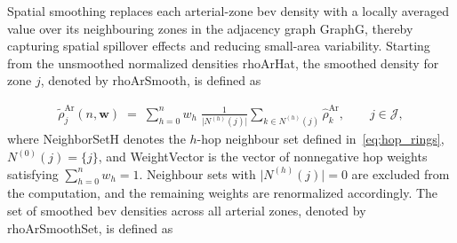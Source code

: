 Spatial smoothing replaces each arterial-zone \gls{bev} density with a locally averaged value over its neighbouring zones in the adjacency graph \gls{GraphG}, thereby capturing spatial spillover effects and reducing small-area variability. 
Starting from the unsmoothed normalized densities \gls{rhoArHat}, the smoothed density for zone $j$, denoted by \gls{rhoArSmooth}, is defined as

\begin{align}
  \label{eq:EV_density_nhop_weighted}
  \tilde{\rho}^{\mathrm{Ar}}_{j}(n,\mathbf{w})
  \;=\;
  \sum_{h=0}^{n} 
  w_h \;\frac{1}{\lvert N^{(h)}(j)\rvert}
  \sum_{k \in N^{(h)}(j)} \widehat{\rho}^{\mathrm{Ar}}_{k},
  \qquad j \in \mathcal{J},
\end{align}
where \gls{NeighborSetH} denotes the $h$-hop neighbour set defined in~\eqref{eq:hop_rings}, $N^{(0)}(j)=\{j\}$, and \gls{WeightVector} is the vector of nonnegative hop weights satisfying $\sum_{h=0}^{n} w_h=1$. 
Neighbour sets with $\lvert N^{(h)}(j)\rvert=0$ are excluded from the computation, and the remaining weights are renormalized accordingly. 
The set of smoothed \gls{bev} densities across all arterial zones, denoted by \gls{rhoArSmoothSet}, is defined as  

